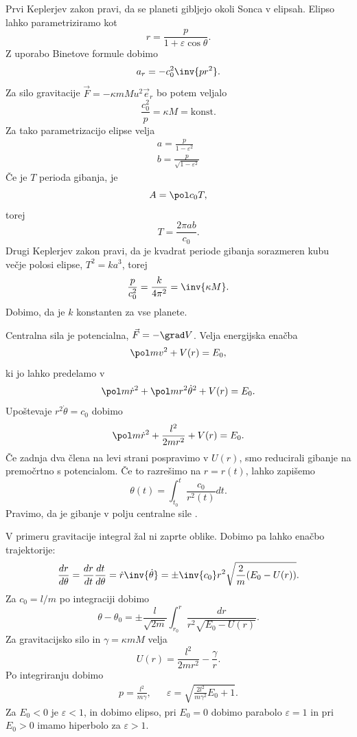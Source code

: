 
Prvi Keplerjev zakon pravi, da se planeti gibljejo okoli Sonca v elipsah.
Elipso lahko parametriziramo kot
\[
  r = \frac{p}{1 + \varepsilon \cos \theta}.
\]
Z uporabo Binetove formule dobimo
\[
  a_r = - c_0^2 \inv{p r^2}.
\]
Za silo gravitacije $\vec{F} = - \kappa mM u^2 \vec{e}_r$ bo potem veljalo
\[
  \frac{c_0^2}{p} = \kappa M = \text{konst.}
\]
Za tako parametrizacijo elipse velja
\begin{gather*}
  a = \frac{p}{1 - \varepsilon^2} \\
  b = \frac{p}{\sqrt{1 - \varepsilon^2}}
\end{gather*}
Če je $T$ perioda gibanja, je
\[
  A = \pol c_0 T,
\]
torej
\[
  T = \frac{2 \pi a b}{c_0}.
\]
Drugi Keplerjev zakon pravi, da je kvadrat periode gibanja sorazmeren kubu večje
polosi elipse, $T^2 = k a^3$, torej
\[
  \frac{p}{c_0^2} = \frac{k}{4 \pi^2} = \inv{\kappa M}.
\]
Dobimo, da je $k$ konstanten za vse planete.


Centralna sila je potencialna, $\vec{F} = -\grad V$.
Velja energijska enačba
\[
  \pol m v^2 + V(r) = E_0,
\]
ki jo lahko predelamo v
\[
  \pol m \dot{r}^2 + \pol m r^2 \dot{\theta}^2 + V(r) = E_0.
\]
Upoštevaje $r^2 \dot{\theta} = c_0$ dobimo
\[
  \pol m \dot{r}^2 + \frac{l^2}{2 m r^2} + V(r) = E_0.
\]
Če zadnja dva člena na levi strani pospravimo v 
$U(r)$, smo reducirali gibanje na premočrtno s potencialom.
Če to razrešimo na $r = r(t)$, lahko zapišemo
\[
  \theta(t) = \int_{t_0}^t \frac{c_0}{r^2(t)} dt.
\]
Pravimo, da je gibanje v polju centralne sile .


V primeru gravitacije integral žal ni zaprte oblike.
Dobimo pa lahko enačbo trajektorije:
\[
  \frac{dr}{d\theta} = \frac{dr}{dt} \frac{dt}{d\theta}
  = \dot{r} \inv{\dot{\theta}}
  = \pm \inv{c_0} r^2 \sqrt{\frac{2}{m} (E_0 - U(r))}.
\]
Za $c_0 = l/m$ po integraciji dobimo
\[
  \theta - \theta_0
  = \pm \frac{l}{\sqrt{2m}} \int_{r_0}^r \frac{dr}{r^2 \sqrt{E_0 - U(r)}}.
\]
Za gravitacijsko silo in $\gamma = \kappa m M$ velja
\[
  U(r) = \frac{l^2}{2 m r^2} - \frac{\gamma}{r}.
\]
Po integriranju dobimo
\begin{align*}
  p = \frac{l^2}{m \gamma},
  && \varepsilon = \sqrt{\frac{2 l^2}{m \gamma^2} E_0 + 1}.
\end{align*}
Za $E_0 < 0$ je $\varepsilon < 1$, in dobimo elipso, pri $E_0 = 0$ dobimo
parabolo $\varepsilon = 1$ in pri $E_0 > 0$ imamo hiperbolo za $\varepsilon >
1$.

